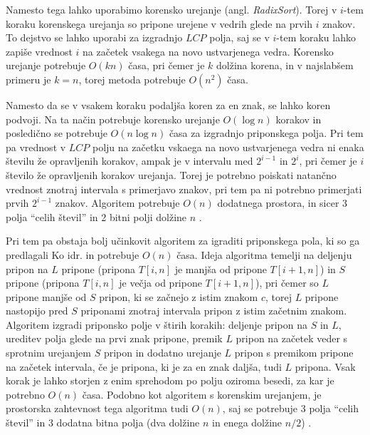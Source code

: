 Namesto tega lahko uporabimo korensko urejanje (angl. \textit{RadixSort}). Torej v $i$-tem koraku korenskega urejanja so pripone urejene v vedrih glede na prvih $i$ znakov. To dejstvo se lahko uporabi za izgradnjo $LCP$ polja, saj se v $i$-tem koraku lahko zapiše vrednost $i$ na začetek vsakega na novo ustvarjenega vedra. Korensko urejanje potrebuje $O(kn)$ časa, pri čemer je $k$ dolžina korena, in v najslabšem primeru je $k=n$, torej metoda potrebuje $O(n^2)$ časa.

Namesto da se v vsakem koraku podaljša koren za en znak, se lahko koren podvoji. Na ta način potrebuje korensko urejanje $O(\log{n})$ korakov in posledično se potrebuje $O(n\log{n})$ časa za izgradnjo priponskega polja. Pri tem pa vrednost v $LCP$ polju na začetku vskaega na novo ustvarjenega vedra ni enaka številu že opravljenih korakov, ampak je v intervalu med $2^{i-1}$ in $2^{i}$, pri čemer je $i$ število že opravljenih korakov urejanja. Torej je potrebno poiskati natančno vrednost znotraj intervala s primerjavo znakov, pri tem pa ni potrebno primerjati prvih $2^{i-1}$ znakov. Algoritem potrebuje $O(n)$ dodatnega prostora, in sicer 3 polja \enquote{celih števil} in 2 bitni polji dolžine $n$ \cite{Manber1990}.


Pri tem pa obstaja bolj učinkovit algoritem za igraditi priponskega pola, ki so ga predlagali Ko idr. \cite{Ko2005} in potrebuje $O(n)$ časa. Ideja algoritma temelji na deljenju pripon na $L$ pripone (pripona $T[i,n]$ je manjša od pripone $T[i+1,n]$) in $S$ pripone (pripona $T[i,n]$ je večja od pripone $T[i+1,n]$), pri čemer so $L$ pripone manjše od $S$ pripon, ki se začnejo z istim znakom $c$, torej $L$ pripone nastopijo pred $S$ priponami znotraj intervala pripon z istim začetnim znakom. Algoritem izgradi priponsko polje v štirih korakih: deljenje pripon na $S$ in $L$, ureditev polja glede na prvi znak pripone, premik $L$ pripon na začetek veder s sprotnim urejanjem $S$ pripon in dodatno urejanje $L$ pripon s premikom pripone na začetek intervala, če je pripona, ki je za en znak daljša, tudi $L$ pripona. Vsak korak je lahko storjen z enim sprehodom po polju oziroma besedi, za kar je potrebno $O(n)$ časa. Podobno kot algoritem s korenskim urejanjem, je prostorska zahtevnost tega algoritma tudi $O(n)$, saj se potrebuje 3 polja \enquote{celih števil} in 3 dodatna bitna polja (dva dolžine $n$ in enega dolžine $n/2$) \cite{Ko2005}.